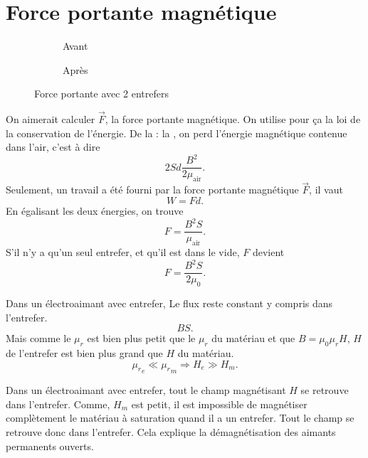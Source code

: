 \section{Force portante magnétique}
\begin{figure}[!ht]
  \begin{subfigure}{0.5\textwidth}
    \caption{Avant}
    \label{fig:before_portance}
  \end{subfigure}
  \begin{subfigure}{0.5\textwidth}
    \caption{Après}
    \label{fig:after_portance}
  \end{subfigure}
  \caption{Force portante avec 2 entrefers}
\end{figure}
On aimerait calculer $\vec F$, la force portante magnétique.
On utilise pour ça la loi de la conservation de l'énergie.
De la  : la ,
on perd l'énergie magnétique contenue dans l'air,
c'est à dire
\[ 2Sd\frac{B^2}{2\mu_\mathrm{air}}. \]
Seulement, un travail a été fourni par la force portante magnétique $\vec F$,
il vaut
\[ W = Fd. \]
En égalisant les deux énergies, on trouve
\[ F = \frac{B^2S}{\mu_\mathrm{air}}. \]
S'il n'y a qu'un seul entrefer, et qu'il est dans le vide, $F$ devient
\[ F = \frac{B^2S}{2\mu_0}. \]

Dans un électroaimant avec entrefer,
Le flux reste constant y compris dans l'entrefer.
\[ B S. \]
Mais comme le $\mu_r$ est bien plus petit que le $\mu_r$ du matériau
et que $B = \mu_0\mu_r H$,
$H$ de l'entrefer est bien plus grand que $H$ du matériau.
\[ {\mu_r}_e \ll {\mu_r}_m \Rightarrow H_e \gg H_m. \]

Dans un électroaimant avec entrefer,
tout le champ magnétisant $H$ se retrouve dans l'entrefer.
Comme, $H_m$ est petit,
il est impossible de magnétiser complètement le
matériau à saturation quand il a un entrefer.
Tout le champ se retrouve donc dans l'entrefer.
Cela explique la démagnétisation des aimants permanents ouverts.


